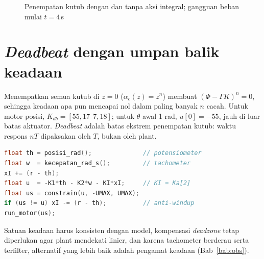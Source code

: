 \begin{figure}[H]
	\centering
	\caption{Penempatan kutub dengan dan tanpa aksi integral; gangguan beban mulai $t = 4$\,s}
	\label{fig:b11-pp}
\end{figure}

\section{\textit{Deadbeat} dengan umpan balik keadaan}
Menempatkan semua kutub di $z = 0$ ($\alpha_c(z) = z^n$) membuat $(\Phi - \Gamma K)^n = 0$, sehingga keadaan apa pun mencapai nol dalam paling banyak $n$ cacah. Untuk motor posisi, $K_{db} = [55{,}17\ \ 7{,}18]$; untuk $\theta$ awal 1 rad, $u[0] = -55$, jauh di luar batas aktuator. \textit{Deadbeat} adalah batas ekstrem penempatan kutub: waktu respons $nT$ dipaksakan oleh $T$, bukan oleh plant.

\begin{lstlisting}[language=C++,caption={Umpan balik keadaan dengan aksi integral pada kit},label={lst:b11-pp}]
float th = posisi_rad();              // potensiometer
float w  = kecepatan_rad_s();         // tachometer
xI += (r - th);
float u  = -K1*th - K2*w - KI*xI;     // KI = Ka[2]
float us = constrain(u, -UMAX, UMAX);
if (us != u) xI -= (r - th);          // anti-windup
run_motor(us);
\end{lstlisting}

Satuan keadaan harus konsisten dengan model, kompensasi \textit{deadzone} tetap diperlukan agar plant mendekati linier, dan karena tachometer berderau serta terfilter, alternatif yang lebih baik adalah pengamat keadaan (Bab~\ref{bab:obs}).

